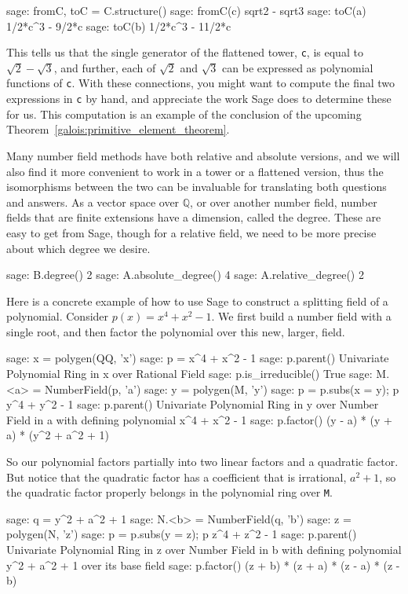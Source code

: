 %
\begin{sageexample}
sage: fromC, toC = C.structure()
sage: fromC(c)
sqrt2 - sqrt3
sage: toC(a)
1/2*c^3 - 9/2*c
sage: toC(b)
1/2*c^3 - 11/2*c
\end{sageexample}
%
This tells us that the single generator of the flattened tower, \verb?c?, is equal to $\sqrt{2}-\sqrt{3}$, and further, each of $\sqrt{2}$ and $\sqrt{3}$ can be expressed as polynomial functions of \verb?c?.  With these connections, you might want to compute the final two expressions in \verb?c? by hand, and appreciate the work Sage does to determine these for us.  This computation is an example of the conclusion of the upcoming Theorem~\ref{galois:primitive_element_theorem}.\par
%
Many number field methods have both relative and absolute versions, and we will also find it more convenient to work in a tower or a flattened version, thus the isomorphisms between the two can be invaluable for translating both questions and answers.
%
As a vector space over ${\mathbb Q}$, or over another number field, number fields that are finite extensions have a dimension, called the degree.  These are easy to get from Sage, though for a relative field, we need to be more precise about which degree we desire.
%
%
\begin{sageexample}
sage: B.degree()
2
sage: A.absolute_degree()
4
sage: A.relative_degree()
2
\end{sageexample}
%
%
Here is a concrete example of how to use Sage to construct a splitting field of a polynomial.  Consider $p(x)=x^4+x^2-1$.  We first build a number field with a single root, and then factor the polynomial over this new, larger, field.
%
\begin{sageexample}
sage: x = polygen(QQ, 'x')
sage: p = x^4 + x^2 - 1
sage: p.parent()
Univariate Polynomial Ring in x over Rational Field
sage: p.is_irreducible()
True
sage: M.<a> = NumberField(p, 'a')
sage: y = polygen(M, 'y')
sage: p = p.subs(x = y); p
y^4 + y^2 - 1
sage: p.parent()
Univariate Polynomial Ring in y over Number Field in a with
defining polynomial x^4 + x^2 - 1
sage: p.factor()
(y - a) * (y + a) * (y^2 + a^2 + 1)
\end{sageexample}
%
So our polynomial factors partially into two linear factors and a quadratic factor.  But notice that the quadratic factor has a coefficient that is irrational, $a^2+1$, so the quadratic factor properly belongs in the polynomial ring over \verb?M?.
%
\begin{sageexample}
sage: q = y^2 + a^2 + 1
sage: N.<b> = NumberField(q, 'b')
sage: z = polygen(N, 'z')
sage: p = p.subs(y = z); p
z^4 + z^2 - 1
sage: p.parent()
Univariate Polynomial Ring in z over Number Field in b with
defining polynomial y^2 + a^2 + 1 over its base field
sage: p.factor()
(z + b) * (z + a) * (z - a) * (z - b)
\end{sageexample}
